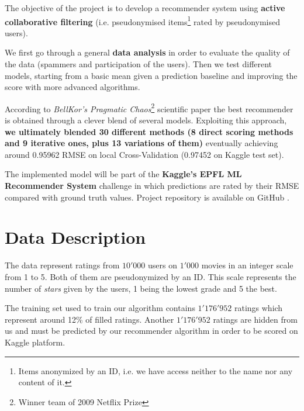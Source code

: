 \documentclass[10pt,conference,compsocconf]{IEEEtran}
\begin{document}
The objective of the project is to develop a recommender system using \textbf{active collaborative filtering} (i.e. pseudonymised items\footnote{Items anonymized by an ID, i.e. we have access neither to the name nor any content of it.} rated by pseudonymised users).

We first go through a general \textbf{data analysis} in order to evaluate the quality of the data (spammers and participation of the users). Then we test different models, starting from a basic mean given a prediction baseline and improving the score with more advanced algorithms.

According to \textit{BellKor's Pragmatic Chaos}\footnote{Winner team of 2009 Netflix Prize} scientific paper \cite{BellKore_netflix} the best recommender is obtained through a clever blend of several models. Exploiting this approach, \textbf{we ultimately blended 30 different methods (8 direct scoring methods and 9 iterative ones, plus 13 variations of them)} eventually achieving around 0.95962 RMSE on local Cross-Validation (0.97452 on Kaggle test set).

The implemented model will be part of the \textbf{Kaggle's EPFL ML Recommender System} challenge in which predictions are rated by their RMSE compared with ground truth values. Project repository is available on GitHub \cite{git_project}.

\section{Data Description}

The data represent ratings from $10'000$ users on $1'000$ movies in an integer scale from 1 to 5. Both of them are pseudonymized by an ID. This scale represents the number of \textit{stars} given by the users, 1 being the lowest grade and 5 the best.

The training set used to train our algorithm contains $1'176'952$ ratings which represent around 12\% of filled ratings. 
Another $1'176'952$ ratings are hidden from us and must be predicted by our recommender algorithm in order to be scored on Kaggle platform.


\end{document}
